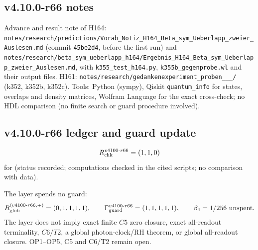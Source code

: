 \subsection*{v4.10.0-r66 notes}
\label{subsec:v4100-r66-notes}

{\raggedright
Advance and result note of H164: \texttt{notes/\allowbreak research/\allowbreak predictions/\allowbreak Vorab\_\allowbreak Notiz\_\allowbreak H164\_\allowbreak Beta\_\allowbreak sym\_\allowbreak Ueberlapp\_\allowbreak zweier\_\allowbreak Auslesen.md}
(commit \texttt{45be2d4}, before the first run) and
\texttt{notes/\allowbreak research/\allowbreak beta\_\allowbreak sym\_\allowbreak ueberlapp\_\allowbreak h164/\allowbreak Ergebnis\_\allowbreak H164\_\allowbreak Beta\_\allowbreak sym\_\allowbreak Ueberlapp\_\allowbreak zweier\_\allowbreak Auslesen.md},
with \texttt{k355\_\allowbreak test\_\allowbreak h164.py}, \texttt{k355b\_\allowbreak gegenprobe.wl} and their output files.
H161: \texttt{notes/\allowbreak research/\allowbreak gedankenexperiment\_\allowbreak proben\_\_\_/} (k352, k352b, k352c).
Tools: Python (sympy), Qiskit \texttt{quantum\_info} for states, overlaps and density matrices, Wolfram Language for the exact cross-check; no HDL
comparison (no finite search or guard procedure involved).
\par}

\subsection*{v4.10.0-r66 ledger and guard update}
\label{subsec:v4100-r66-ledger-guard}

\[
R_{\rm chk}^{v4100\text{-}r66}=(1,1,0)
\]
for (status recorded; computations checked in the cited scripts; no comparison with data).

The layer spends no guard:
\[
R_{\rm glob}^{(v4100\text{-}r66,+)}=(0,1,1,1,1),
\qquad
\Gamma_{\rm guard}^{v4100\text{-}r66}=(1,1,1,1,1),
\qquad
\beta_4=1/256\ \text{unspent}.
\]
The layer does not imply exact finite \(C5\) zero closure, exact all-readout terminality, \(C6/T2\), a global photon-clock/RH theorem,
or global all-readout closure.  OP1--OP5, C5 and C6/T2 remain open.
